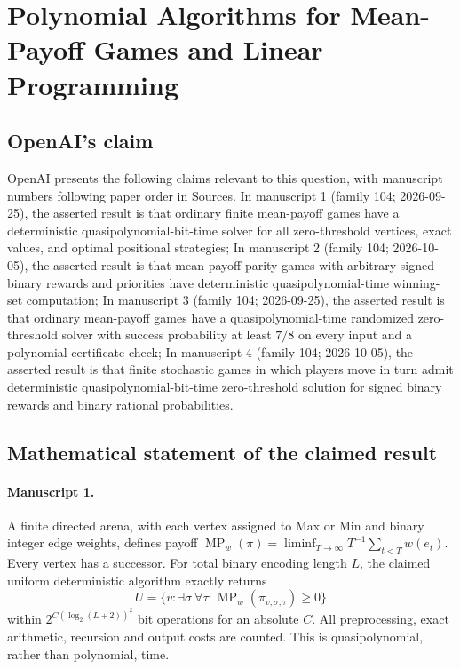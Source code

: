\documentclass[11pt]{article}
\begin{document}
\section*{Polynomial Algorithms for Mean-Payoff Games and Linear Programming}

\subsection{OpenAI's claim}
OpenAI presents the following claims relevant to this question, with manuscript numbers following paper order in Sources. In manuscript 1 (family 104; 2026-09-25), the asserted result is that ordinary finite mean-payoff games have a deterministic quasipolynomial-bit-time solver for all zero-threshold vertices, exact values, and optimal positional strategies; In manuscript 2 (family 104; 2026-10-05), the asserted result is that mean-payoff parity games with arbitrary signed binary rewards and priorities have deterministic quasipolynomial-time winning-set computation; In manuscript 3 (family 104; 2026-09-25), the asserted result is that ordinary mean-payoff games have a quasipolynomial-time randomized zero-threshold solver with success probability at least $7/8$ on every input and a polynomial certificate check; In manuscript 4 (family 104; 2026-10-05), the asserted result is that finite stochastic games in which players move in turn admit deterministic quasipolynomial-bit-time zero-threshold solution for signed binary rewards and binary rational probabilities.

\subsection{Mathematical statement of the claimed result}
\paragraph{Manuscript 1.}
A finite directed arena, with each vertex assigned to Max or Min and binary integer edge weights, defines payoff $\operatorname{MP}_w(\pi)=\liminf_{T\to\infty}T^{-1}\sum_{t<T}w(e_t)$. Every vertex has a successor. For total binary encoding length $L$, the claimed uniform deterministic algorithm exactly returns
\[
 U=\{v:\exists\sigma\ \forall\tau:\operatorname{MP}_w(\pi_{v,\sigma,\tau})\ge0\}
\]
within $2^{C(\log_2(L+2))^2}$ bit operations for an absolute $C$. All preprocessing, exact arithmetic, recursion and output costs are counted. This is quasipolynomial, rather than polynomial, time.
\end{document}
